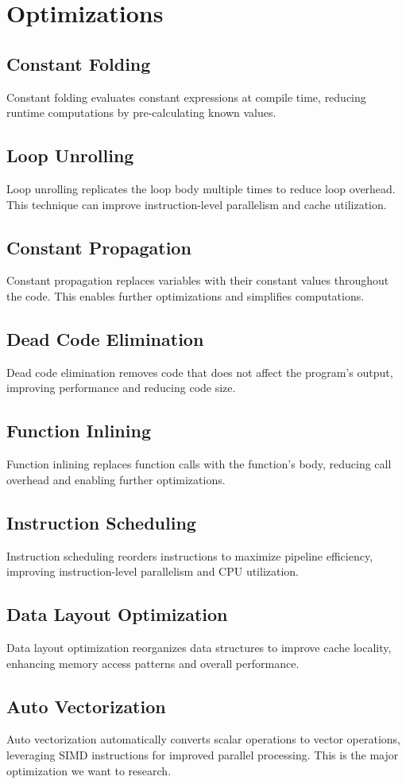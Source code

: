 \documentclass{article}
\begin{document}
\section{Optimizations}

\subsection{Constant Folding}
Constant folding evaluates constant expressions at compile time, reducing runtime computations by pre-calculating known values.

\subsection{Loop Unrolling}
Loop unrolling replicates the loop body multiple times to reduce loop overhead. This technique can improve instruction-level parallelism and cache utilization.

\subsection{Constant Propagation}
Constant propagation replaces variables with their constant values throughout the code. This enables further optimizations and simplifies computations.

\subsection{Dead Code Elimination}
Dead code elimination removes code that does not affect the program's output, improving performance and reducing code size.

\subsection{Function Inlining}
Function inlining replaces function calls with the function's body, reducing call overhead and enabling further optimizations.

\subsection{Instruction Scheduling}
Instruction scheduling reorders instructions to maximize pipeline efficiency, improving instruction-level parallelism and CPU utilization.

\subsection{Data Layout Optimization}
Data layout optimization reorganizes data structures to improve cache locality, enhancing memory access patterns and overall performance.

\subsection{Auto Vectorization}
Auto vectorization automatically converts scalar operations to vector operations, leveraging SIMD instructions for improved parallel processing. This is the major optimization we want to research.
\end{document}
